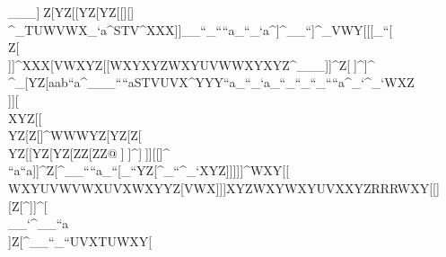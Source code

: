   ___]^^YZ[YZ[[\]YZ[YZ[[\]\]][\]\]]^^_                                                            \\\Z[\^__PQRWXY]^_TUWVWX_`a\]^STV\]^                                                            XXX]]__``_````a_``_`a\]^]^__``]^_VWY                                                            [[[_``[\\[[\YZ[[\]WXYYZ[XYZWXYXYZWXY                                                            \\\YZ[UVWWXYVWXWXYSSSWXY[[\YZ[WXY_``                                                            \\\YZ[YZ[WXYZZ\UVXUVXUVXVWXVWXWXY[\]                                                            \\\[\]XYZYZ[[[\[\]YZ[ZZ[\]]Z[\[\]]]^                                                            XXX[\]VWXYZ[[\]WXYXYZWXYUVWWXYXYZ\]^                                                            ___]]^Z[\Z[\YZ[WXYXYZ[\]]^^]]^\]]\]^                                                            \\\]^_[\]YZ[aab``a^___````aSTVUVX\]^                                                            YYY``a_``_`a_``_``_``_````a^_`^_`WXZ                                                            \\\Z[\WXYWXYYZ[STVWXYXYZUVWXYZVWXWXY                                                            [[[XYZUVWXYZVWXXYZSSSVWX[\][[\WXY_``                                                            \\\YZ[XYZYZ[[[\VWXWXYUVWUVWWXYUVXYZ[                                                            ]]][\\XYZ[[\[\]YZ[Z[\YZ[\\][\][\]]]^                                                            WWWYZ[YZ[Z[\[\]YZ[[\]YZ[YZ[ZZ[ZZ\]^^                                                            ^^^]^^\\][\]YZ[VWX[\]]]^]^^\]][[\]]^                                                            \\\WXYUVX``a``a]]^Z[\Z[\\\^YZ[YZ[Z[\                                                            [[[]^__````a_``[\]_``YZ[\]^_``^_`XYZ                                                            ]]]]]^WXY[[\[\]WXYUVWVWXUVXWXYYZ[VWX                                                            ]]]XYZWXYWXYUVXXYZRRRWXY[[\Z[\WXY_``                                                            \\\YZ[XYZ[\]XYZWXYUVXUVWUVXUVWVWXZ[\                                                            \\\[\\YZ[YZ[ZZ[WXYYZ[Z[\[\][\]YZ[[\]                                                            XXXYZ[XYZ[\]XYZXYZYZ[Z[\YZ[YZ[[[\\\^                                                            \\\\]][\]Z[\YZ[YZ[[\][[\]]^]]^[\]^^_                                                            \\\__`^__``a\\]Z[\]^__``_``UVXTUWXY[
